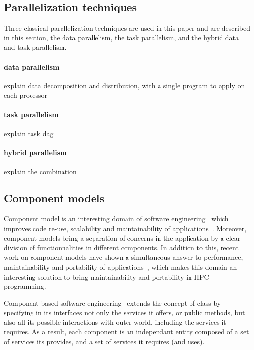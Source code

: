 \subsection{Parallelization techniques}
\label{sect:parallel}
Three classical parallelization techniques are used in this paper and are described in this section, the data parallelism, the task parallelism, and the hybrid data and task parallelism.

\paragraph{data parallelism} explain data decomposition and distribution, with a single program to apply on each processor

\paragraph{task parallelism} explain task dag

\paragraph{hybrid parallelism} explain the combination


\subsection{Component models}
Component model is an interesting domain of software engineering~\cite{Szyperski:2002:CSB:515228} which improves code re-use, scalability and maintainability of applications~\cite{Szyperski:2002:CSB:515228,bigot:inria-00388508}. Moreover, component models bring a separation of concerns in the application by a clear division of functionnalities in different components. In addition to this, recent work on component models have shown a simultaneous answer to performance, maintainability and portability of applications~\cite{l2c}, which makes this domain an interesting solution to bring maintainability and portability in HPC programming.

Component-based software engineering~\cite{Szyperski:2002:CSB:515228} extends the concept of class by specifying in its interfaces not only the services it offers, or public methods, but also all its possible interactions with outer world, including the services it requires. As a result, each component is an independant entity composed of a set of services its provides, and a set of services it requires (and uses). 

